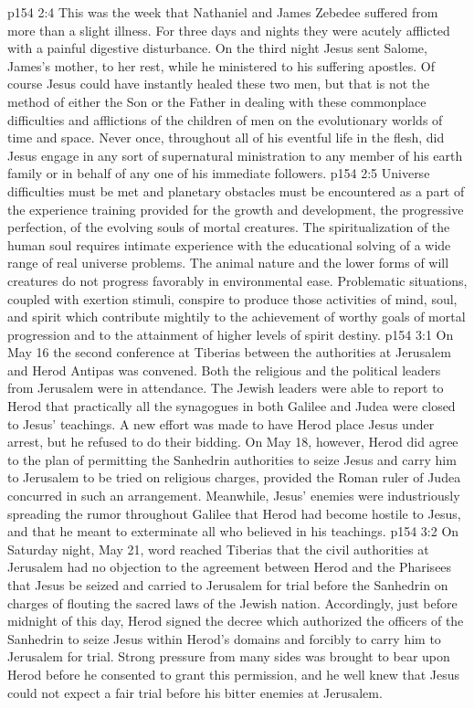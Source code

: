 \pc \vs p154 2:4 This was the week that Nathaniel and James Zebedee suffered from more than a slight illness. For three days and nights they were acutely afflicted with a painful digestive disturbance. On the third night Jesus sent Salome, James’s mother, to her rest, while he ministered to his suffering apostles. Of course Jesus could have instantly healed these two men, but that is not the method of either the Son or the Father in dealing with these commonplace difficulties and afflictions of the children of men on the evolutionary worlds of time and space. Never once, throughout all of his eventful life in the flesh, did Jesus engage in any sort of supernatural ministration to any member of his earth family or in behalf of any one of his immediate followers.
\vs p154 2:5 Universe difficulties must be met and planetary obstacles must be encountered as a part of the experience training provided for the growth and development, the progressive perfection, of the evolving souls of mortal creatures. The spiritualization of the human soul requires intimate experience with the educational solving of a wide range of real universe problems. The animal nature and the lower forms of will creatures do not progress favorably in environmental ease. Problematic situations, coupled with exertion stimuli, conspire to produce those activities of mind, soul, and spirit which contribute mightily to the achievement of worthy goals of mortal progression and to the attainment of higher levels of spirit destiny.
\vs p154 3:1 On May 16 the second conference at Tiberias between the authorities at Jerusalem and Herod Antipas was convened. Both the religious and the political leaders from Jerusalem were in attendance. The Jewish leaders were able to report to Herod that practically all the synagogues in both Galilee and Judea were closed to Jesus’ teachings. A new effort was made to have Herod place Jesus under arrest, but he refused to do their bidding. On May 18, however, Herod did agree to the plan of permitting the Sanhedrin authorities to seize Jesus and carry him to Jerusalem to be tried on religious charges, provided the Roman ruler of Judea concurred in such an arrangement. Meanwhile, Jesus’ enemies were industriously spreading the rumor throughout Galilee that Herod had become hostile to Jesus, and that he meant to exterminate all who believed in his teachings.
\vs p154 3:2 On Saturday night, May 21, word reached Tiberias that the civil authorities at Jerusalem had no objection to the agreement between Herod and the Pharisees that Jesus be seized and carried to Jerusalem for trial before the Sanhedrin on charges of flouting the sacred laws of the Jewish nation. Accordingly, just before midnight of this day, Herod signed the decree which authorized the officers of the Sanhedrin to seize Jesus within Herod’s domains and forcibly to carry him to Jerusalem for trial. Strong pressure from many sides was brought to bear upon Herod before he consented to grant this permission, and he well knew that Jesus could not expect a fair trial before his bitter enemies at Jerusalem.
